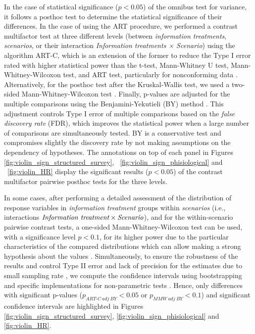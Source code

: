 In the case of statistical significance ($p<0.05$) of the omnibus test for variance, it follows a posthoc test to determine the statistical significance of their differences. In the case of using the ART procedure, we performed a contrast multifactor test at three different levels (between \emph{information treatments}, \emph{scenarios}, or their interaction \emph{Information treatments × Scenario}) using the algorithm ART-C, which is an extension of the former to reduce the Type I error rated with higher statistical power than the t-test, Mann-Whitney U test, Mann-Whitney-Wilcoxon test, and ART test, particularly for nonconforming data \cite{Elkin2021}. Alternatively, for the posthoc test after the Kruskal-Wallis test, we used a two-sided Mann-Whitney-Wilcoxon test \cite{Mann1947}. Finally, p-values are adjusted for the multiple comparisons using the Benjamini-Yekutieli (BY) method \cite{Benjamini2001}. This adjustment controls Type I error of multiple comparisons based on the \emph{false discovery rate} (FDR), which improves the statistical power when a large number of comparisons are simultaneously tested\cite{Benjamini1995}. BY is a conservative test and compromises slightly the discovery rate by not making assumptions on the dependency of hypotheses. The annotations \cite{florian_charlier_2022_7213391} on top of each panel in Figures \ref{fig:violin_sign_structured_survey}, ~\ref{fig:violin_sign_phisiological} and ~\ref{fig:violin_HR} display the significant results ($p<0.05$) of the contrast multifactor pairwise posthoc tests for the three levels.

In some cases, after performing a detailed assessment of the distribution of response variables in \emph{information treatment} groups within \emph{scenarios} (i.e., interactions $\emph{Information treatment} \times \emph{Scenario}$), and for the within-scenario pairwise contrast tests, a one-sided Mann-Whitney-Wilcoxon test can be used, with a significance level $p < 0.1$, for its higher power due to the particular characteristics of the compared distributions which can allow making a strong hypothesis about the values \cite{Fagerland2009, Fuest2020}. Simultaneously, to ensure the robustness of the results and control Type II error and lack of precision for the estimates due to small sampling rate \cite{Lakens2022}, we compute the confidence intervals using bootstrapping \cite{DiCiccio1996} and specific implementations for non-parametric tests \cite{Campbell1988}. Hence, only  differences with significant p-values ($p_{ART\text{-}C\ adj\ BY}<0.05$ or $p_{MMW\ adj\ BY}<0.1$) and significant confidence intervals are highlighted in Figures \ref{fig:violin_sign_structured_survey}, \ref{fig:violin_sign_phisiological} and \ref{fig:violin_HR}.


